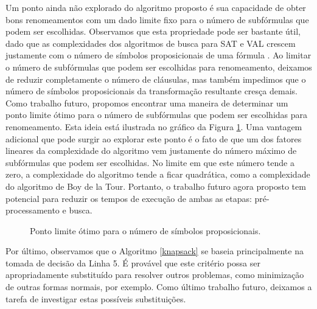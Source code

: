 Um ponto ainda não explorado do algoritmo proposto é sua capacidade de obter bons renomeamentos com um dado limite fixo para o número de subfórmulas que podem ser escolhidas. Observamos que esta propriedade pode ser bastante útil, dado que as complexidades dos algoritmos de busca para SAT e VAL crescem justamente com o número de símbolos proposicionais de uma fórmula \cite{davis1960computing,davis1962machine,biere2009conflict}. Ao limitar o número de subfórmulas que podem ser escolhidas para renomeamento, deixamos de reduzir completamente o número de cláusulas, mas também impedimos que o número de símbolos proposicionais da transformação resultante cresça demais. Como trabalho futuro, propomos encontrar uma maneira de determinar um ponto limite ótimo para o número de subfórmulas que podem ser escolhidas para renomeamento. Esta ideia está ilustrada no gráfico da Figura \ref{limitando}. Uma vantagem adicional que pode surgir ao explorar este ponto é o fato de que um dos fatores lineares da complexidade do algoritmo vem justamente do número máximo de subfórmulas que podem ser escolhidas. No limite em que este número tende a zero, a complexidade do algoritmo tende a ficar quadrática, como a complexidade do algoritmo de Boy de la Tour. Portanto, o trabalho futuro agora proposto tem potencial para reduzir os tempos de execução de ambas as etapas: pré-processamento e busca.

\begin{figure}
	\begin{center}
\end{center}
\label{limitando}
\caption{Ponto limite ótimo para o número de símbolos proposicionais.}
\end{figure}

Por último, observamos que o Algoritmo \ref{knapsack} se baseia principalmente na tomada de decisão da Linha 5. É provável que este critério possa ser apropriadamente substituído para resolver outros problemas, como minimização de outras formas normais, por exemplo. Como último trabalho futuro, deixamos a tarefa de investigar estas possíveis substituições.
